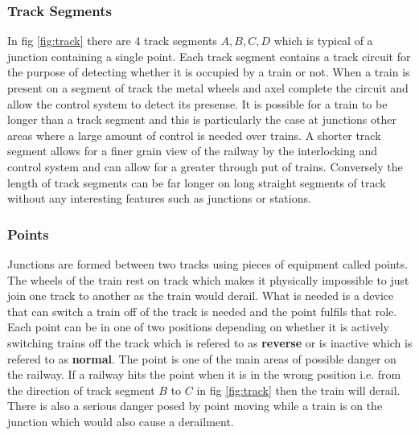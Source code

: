 \subsubsection{Track Segments}

In fig \ref{fig:track}  there are 4 track segments $A,B,C,D$ which is typical of a junction containing a single point. Each track segment contains a track circuit for the purpose of detecting whether it is occupied by a train or not. When a train is present on a segment of track the metal wheels and axel complete the circuit and allow the control system to detect its presense. It is possible for a train to be longer than a track segment and this is particularly the case at junctions other areas where a large amount of control is needed over trains. A shorter track segment allows for a finer grain view of the railway by the interlocking and control system and can allow for a greater through put of trains. Conversely the length of track segments can be far longer on long straight segments of track without any interesting features such as junctions or stations.

\begin{comment}
A section of track is typically broken down into track segments each
containing one or more track circuits to detect the presence of a
train. Typically track segments become larger on long straight stretches of
track without any interesting topological features such as junctions or
stations. Likewise track segments become smaller around junctions and stations
where control over train movement is of greater importance. 
\end{comment}


\subsubsection{Points}
Junctions are formed between two tracks using  pieces of equipment called points. The wheels of the train rest on track which makes it physically impossible to just join one track to another as the train would derail.  What is needed is a device that can switch a train off of the track is needed and the point fulfils that role.  Each point can be in one of two positions depending on whether it is actively switching trains off the track which is refered to as \textbf{reverse}  or is inactive which is refered to as \textbf{normal}. The point is one of the main areas of possible danger on the railway. If a railway hits the point when it is in the wrong position i.e. from the direction of track segment $B$ to $C$ in fig \ref{fig:track} then the train will derail. There is also a serious danger posed by point moving while a train is on the junction which would also cause a derailment.

